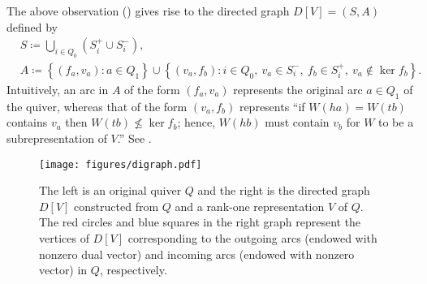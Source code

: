 \documentclass[a4paper,11pt]{article}
\numberwithin{equation}{section}
\begin{document}
The above observation () gives rise to the directed graph $D[V] = (S, A)$ defined by
\begin{align}
    &S \coloneqq \bigcup_{i \in Q_0} \left(S_i^+ \cup S_i^-\right),\\
    &A \coloneqq \left\{ (f_a, v_a) : a \in Q_1 \right\} \cup \left\{ (v_a, f_b) : i \in Q_0,\ v_a \in S_i^-, \ f_b \in S_i^+,\ v_a \notin \ker f_b \right\}.
\end{align}
Intuitively, an arc in $A$ of the form $(f_a, v_a)$ represents the original arc $a \in Q_1$ of the quiver, whereas that of the form $(v_a, f_b)$ represents ``if $W(ha) = W(tb)$ contains $v_a$ then $W(tb) \not\leq \ker f_b$; hence, $W(hb)$ must contain $v_b$ for $W$ to be a subrepresentation of $V$.''
See .
\begin{figure}
    \centering
    \texttt{[image: figures/digraph.pdf]}
    \caption{The left is an original quiver $Q$ and the right is the directed graph $D[V]$ constructed from $Q$ and a rank-one representation $V$ of $Q$. The red circles and blue squares in the right graph represent the vertices of $D[V]$ corresponding to the outgoing arcs (endowed with nonzero dual vector) and incoming arcs (endowed with nonzero vector) in $Q$, respectively.\label{fig:D[V]}}
\end{figure}
\end{document}
